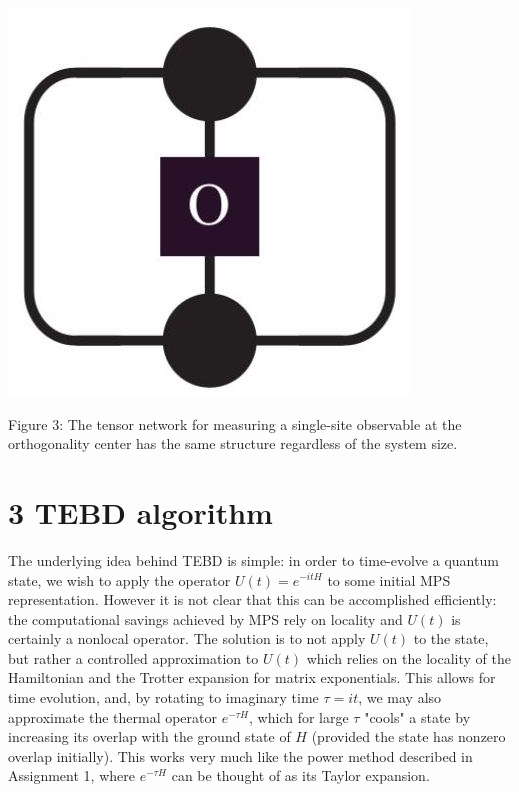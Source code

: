 \documentclass[12pt]{article}
\begin{document}
\begin{center}
\includegraphics[max width=\textwidth]{2024_05_17_c251ec82fd3768475949g-05}
\end{center}

Figure 3: The tensor network for measuring a single-site observable at the orthogonality center has the same structure regardless of the system size.

\section*{3 TEBD algorithm}
The underlying idea behind TEBD is simple: in order to time-evolve a quantum state, we wish to apply the operator $U(t)=e^{-i t H}$ to some initial MPS representation. However it is not clear that this can be accomplished efficiently: the computational savings achieved by MPS rely on locality and $U(t)$ is certainly a nonlocal operator. The solution is to not apply $U(t)$ to the state, but rather a controlled approximation to $U(t)$ which relies on the locality of the Hamiltonian and the Trotter expansion for matrix exponentials. This allows for time evolution, and, by rotating to imaginary time $\tau=i t$, we may also approximate the thermal operator $e^{-\tau H}$, which for large $\tau$ "cools" a state by increasing its overlap with the ground state of $H$ (provided the state has nonzero overlap initially). This works very much like the power method described in Assignment 1, where $e^{-\tau H}$ can be thought of as its Taylor expansion.
\end{document}
